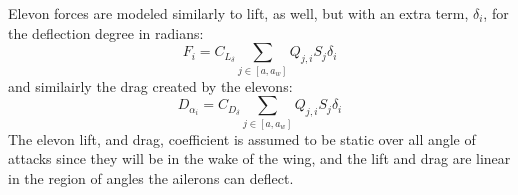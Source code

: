Elevon forces are modeled similarly to lift, as well, but with an extra term, $\delta_i$, for the deflection degree in radians:\cite{nelson}
\begin{equation}
    F_i = C_{L_\delta} \sum_{j \in [a, a_w]}  Q_{j,i} S_j \delta_i
\end{equation}
and similairly the drag created by the elevons:
\begin{equation}
    D_{\alpha_i} = C_{D_\delta} \sum_{j \in [a, a_w]}  Q_{j,i} S_j \delta_i
\end{equation}
The elevon lift, and drag, coefficient is assumed to be static over all angle of attacks since they will be in the wake of the wing, and the lift and drag are linear in the region of angles the ailerons can deflect.
